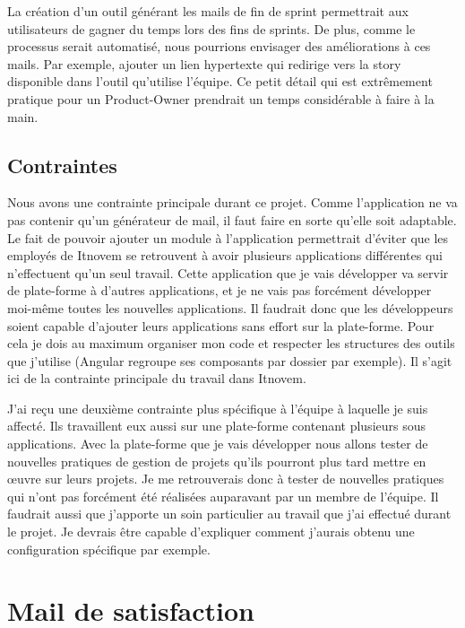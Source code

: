 \documentclass[12pt, twoside, openright]{report}
\begin{document}
La création d'un outil générant les mails de fin de sprint permettrait aux utilisateurs de gagner du temps lors des fins de sprints. De plus, comme le processus serait automatisé, nous pourrions envisager des améliorations à ces mails. Par exemple, ajouter un lien hypertexte qui redirige vers la story disponible dans l'outil qu'utilise l'équipe. Ce petit détail qui est extrêmement pratique pour un Product-Owner prendrait un temps considérable à faire à la main.

\subsection{Contraintes}

Nous avons une contrainte principale durant ce projet. Comme l'application ne va pas contenir qu'un générateur de mail, il faut faire en sorte qu'elle soit adaptable. Le fait de pouvoir ajouter un module à l'application permettrait d'éviter que les employés de Itnovem se retrouvent à avoir plusieurs applications différentes qui n'effectuent qu'un seul travail. Cette application que je vais développer va servir de plate-forme à d'autres applications, et je ne vais pas forcément développer moi-même toutes les nouvelles applications. Il faudrait donc que les développeurs soient capable d'ajouter leurs applications sans effort sur la plate-forme. Pour cela je dois au maximum organiser mon code et respecter les structures des outils que j'utilise (Angular regroupe ses composants par dossier par exemple). Il s'agit ici de la contrainte principale du travail dans Itnovem. 

J'ai reçu une deuxième contrainte plus spécifique à l'équipe à laquelle je suis affecté. Ils travaillent eux aussi sur une plate-forme contenant plusieurs sous applications. Avec la plate-forme que je vais développer nous allons tester de nouvelles pratiques de gestion de projets qu'ils pourront plus tard mettre en œuvre sur leurs projets. Je me retrouverais donc à tester de nouvelles pratiques qui n'ont pas forcément été réalisées auparavant par un  membre de l'équipe. Il faudrait aussi que j'apporte un soin particulier au travail que j'ai effectué durant le projet. Je devrais être capable d'expliquer comment j'aurais obtenu une configuration spécifique par exemple.  

\section{Mail de satisfaction}
\end{document}
